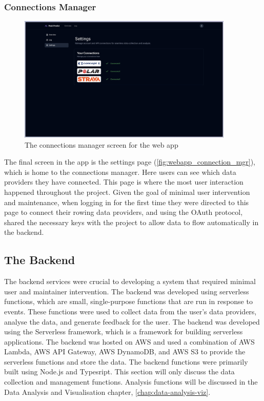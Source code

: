 \subsubsection{Connections Manager}

\begin{figure}[htbp]
  \centering
  \includegraphics[height=6cm]{figures/fyp_connections_page.jpeg}
  \captionsetup{justification=centering}
  \caption[Web app Connections Manager]{\label{fig:webapp_connection_mgr}The connections manager screen for the web app} 
\end{figure}
The final screen in the app is the settings page (\autoref{fig:webapp_connection_mgr}), which is home to the connections manager. Here users can see which data providers they have connected. This page is where the most user interaction happened throughout the project. Given the goal of minimal user intervention and maintenance, when logging in for the first time they were directed to this page to connect their rowing data providers, and using the OAuth protocol, shared the necessary keys with the project to allow data to flow automatically in the backend.  

\subsection{The Backend}
The backend services were crucial to developing a system that required minimal user and maintainer intervention. The backend was developed using serverless functions, which are small, single-purpose functions that are run in response to events. These functions were used to collect data from the user's data providers, analyse the data, and generate feedback for the user. The backend was developed using the Serverless framework, which is a framework for building serverless applications. The backend was hosted on AWS and used a combination of AWS Lambda, AWS API Gateway, AWS DynamoDB, and AWS S3 to provide the serverless functions and store the data. The backend functions were primarily built using Node.js and Typesript. This section will only discuss the data collection and management functions. Analysis functions will be discussed in the Data Analysis and Visualisation chapter, \autoref{chap:data-analysis-viz}.

